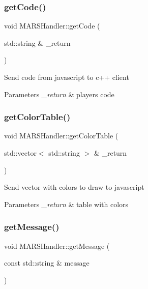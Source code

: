 \subsubsection{\texorpdfstring{get\+Code()}{getCode()}}
{\footnotesize\ttfamily void M\+A\+R\+S\+Handler\+::get\+Code (\begin{DoxyParamCaption}\item[{std\+::string \&}]{\+\_\+return }\end{DoxyParamCaption})\hspace{0.3cm}{\ttfamily [inline]}}

Send code from javascript to c++ client 
\begin{DoxyParams}{Parameters}
{\em \+\_\+return} & player\textquotesingle{}s code \\
\hline
\end{DoxyParams}
\mbox{\label{classMARSHandler_a9cc24026adecda320622810448188173}} 
\subsubsection{\texorpdfstring{get\+Color\+Table()}{getColorTable()}}
{\footnotesize\ttfamily void M\+A\+R\+S\+Handler\+::get\+Color\+Table (\begin{DoxyParamCaption}\item[{std\+::vector$<$ std\+::string $>$ \&}]{\+\_\+return }\end{DoxyParamCaption})\hspace{0.3cm}{\ttfamily [inline]}}

Send vector with colors to draw to javascript 
\begin{DoxyParams}{Parameters}
{\em \+\_\+return} & table with colors \\
\hline
\end{DoxyParams}
\mbox{\label{classMARSHandler_a87dbdc238b461bf59eb53e0a881aa34e}} 
\subsubsection{\texorpdfstring{get\+Message()}{getMessage()}}
{\footnotesize\ttfamily void M\+A\+R\+S\+Handler\+::get\+Message (\begin{DoxyParamCaption}\item[{const std\+::string \&}]{message }\end{DoxyParamCaption})\hspace{0.3cm}{\ttfamily [inline]}}

